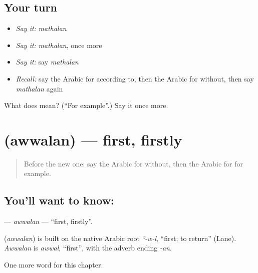 \subsection*{Your turn}
\begin{itemize}
\raggedright
  \item \emph{Say it:} \emph{mathalan}
  \item \emph{Say it:} \emph{mathalan}, once more
  \item \emph{Say it:} say \emph{mathalan}
  \item \emph{Recall:} say the Arabic for according to, then the Arabic for without, then say \emph{mathalan} again
\end{itemize}

\begin{tcolorbox}[breakable,colback=teal!4,colframe=teal!35!black,title={Before you move on}]
What does  mean? (\textquotedblleft{}For example\textquotedblright{}.) Say it once more.
\end{tcolorbox}
\section[\texorpdfstring{\ar{أولا} (awwalan)}{أولا (awwalan)}]{ (awwalan) — first, firstly}

\label{lesson:AR-C268-awwalan}



\begin{quote}
Before the new one: say the Arabic for without, then the Arabic for for example.
\end{quote}

\subsection*{You'll want to know: }
\textbf{} — \emph{awwalan} — \textquotedblleft{}first, firstly\textquotedblright{}.

\begin{cousinweb}
\textbf{} (\emph{awwalan}) is built on the native Arabic root \emph{ʾ-w-l}, \textquotedblleft{}first; to return\textquotedblright{} (Lane). \emph{Awwalan} is \emph{awwal}, \textquotedblleft{}first\textquotedblright{}, with the adverb ending \emph{-an}.
\end{cousinweb}

\begin{grammarlens}[title={What you've built}]
One more word for this chapter.
\end{grammarlens}


